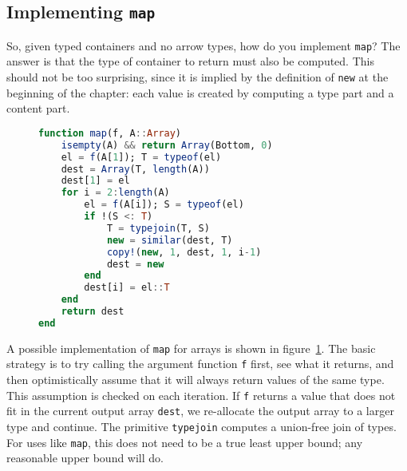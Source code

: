 \subsection{Implementing \texttt{map}}

So, given typed containers and no arrow types, how do you implement
\texttt{map}? The answer is that the type of container to return must
also be computed. This should not be too surprising, since it is implied by
the definition of \texttt{new} at the beginning of the chapter: each
value is created by computing a type part and a content part.

\begin{singlespace}
\begin{figure}
\begin{lstlisting}[language=julia]
function map(f, A::Array)
    isempty(A) && return Array(Bottom, 0)
    el = f(A[1]); T = typeof(el)
    dest = Array(T, length(A))
    dest[1] = el
    for i = 2:length(A)
        el = f(A[i]); S = typeof(el)
        if !(S <: T)
            T = typejoin(T, S)
            new = similar(dest, T)
            copy!(new, 1, dest, 1, i-1)
            dest = new
        end
        dest[i] = el::T
    end
    return dest
end
\end{lstlisting}
  \caption[An implementation of \texttt{map}]{
  }
  \label{fig:mapimpl}
\end{figure}
\end{singlespace}

A possible implementation of \texttt{map} for arrays is shown in
figure~\ref{fig:mapimpl}.
The basic strategy is to try calling the argument function \texttt{f}
first, see what it returns, and then optimistically assume that it
will always return values of the same type.
This assumption is checked on each iteration.
If \texttt{f} returns a value that does not fit in the current output
array \texttt{dest}, we re-allocate the output array to a larger
type and continue.
The primitive \texttt{typejoin} computes a union-free join of types.
For uses like \texttt{map}, this does not need to be a true least
upper bound; any reasonable upper bound will do.

